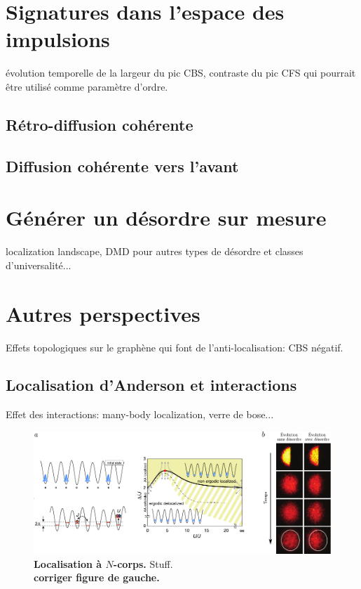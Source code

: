 \section{Signatures dans l'espace des impulsions}
évolution temporelle de la largeur du pic CBS, contraste du pic CFS qui pourrait être utilisé comme paramètre d'ordre. 

\subsection{Rétro-diffusion cohérente}
\subsection{Diffusion cohérente vers l'avant}

\section{Générer un désordre sur mesure} 
localization landscape, DMD pour autres types de désordre et classes d'universalité...

\section{Autres perspectives}
Effets topologiques sur le graphène qui font de l'anti-localisation: CBS négatif. 

\subsection{Localisation d'Anderson et interactions}
Effet des interactions: many-body localization, verre de bose...
\citep{schreiber2015observation} \citep{choi2016exploring}
\begin{figure}
\centering
\includegraphics[width=\textwidth]{Fig/Conclusion/many_body_localisation.pdf}
\caption{\textbf{Localisation à $N$-corps.} Stuff. \\
\textbf{corriger figure de gauche.}}
\label{fig:many_body_localisation}
\end{figure}


